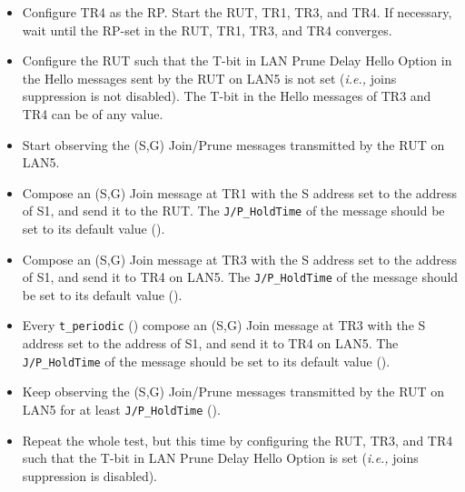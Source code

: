 \documentclass[11pt]{report}
\newcommand{\ie}{\emph{i.e.,}\xspace}
\begin{document}

\begin{itemize}

  \item Configure TR4 as the RP. Start the RUT, TR1, TR3, and TR4. If
  necessary, wait until the RP-set in the RUT, TR1, TR3, and TR4
  converges.

  \item Configure the RUT such that the T-bit in LAN Prune Delay Hello
  Option in the Hello messages sent by the RUT on LAN5 is not set (\ie joins
  suppression is not disabled). The T-bit in the Hello messages of TR3 and TR4
  can be of any value.

  \item Start observing the (S,G) Join/Prune messages transmitted by the
  RUT on LAN5.

  \item Compose an (S,G) Join message at TR1 with the S address set to the
  address of S1, and send it to the RUT. 
  The \verb=J/P_HoldTime= of the message should be set to its default
  value ({\PimsmJPHoldTime}).

  \item Compose an (S,G) Join message at TR3 with the S address set to the
  address of S1, and send it to TR4 on LAN5.
  The \verb=J/P_HoldTime= of the message should be set to its default
  value ({\PimsmJPHoldTime}).

  \item Every \verb=t_periodic= ({\PimsmTPeriodic}) compose an (S,G) Join
  message at TR3 with the S address set to the address of S1, and send it to
  TR4 on LAN5.
  The \verb=J/P_HoldTime= of the message should be set to its default
  value ({\PimsmJPHoldTime}).

  \item Keep observing the (S,G) Join/Prune messages transmitted by the
  RUT on LAN5 for at least \verb=J/P_HoldTime= ({\PimsmJPHoldTime}).

  \item Repeat the whole test, but this time by configuring the RUT, TR3, and
  TR4 such that the T-bit in LAN Prune Delay Hello Option is set (\ie joins
  suppression is disabled).

\end{itemize}

\end{document}
